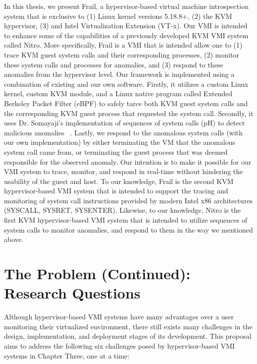 \documentclass{report}
\begin{document}
\begin{spacing}{1.5}
{\large 
In this thesis, we present Frail, a hypervisor-based virtual machine introspection system that is exclusive to (1) Linux kernel versions 5.18.8+, (2) the KVM hypervisor, (3) and Intel Virtualization Extension (VT-x). Our VMI is intended to enhance some of the capabilities of a previously developed KVM VMI system called Nitro. More specifically, Frail is a VMI that is intended allow one to (1) trace KVM guest system calls and their corresponding processes, (2) monitor these system calls and processes for anomalies, and (3) respond to these anomalies from the hypervisor level. Our framework is implemented using a combination of existing and our own software. Firstly, it utilizes a custom Linux kernel, custom KVM module, and a Linux native program called Extended Berkeley Packet Filter (eBPF) to safely tarce both KVM guest system calls and the corresponding KVM guest process that requested the system call. Secondly, it uses Dr. Somayaji's implementation of sequences of system calls (pH) to detect malicious anomalies ~\cite{somayaji2002operating}. Lastly, we respond to the anomalous system calls (with our own implementation) by either terminating the VM that the anomalous system call came from, or terminating the guest process that was deemed responsible for the observed anomaly. Our intention is to make it possible for our VMI system to trace, monitor, and respond in real-time without hindering the usability of the guest and host. To our knowledge, Frail is the second KVM hypervisor-based VMI system that is intended to support the tracing and monitoring of system call instructions provided by modern Intel x86 architectures (SYSCALL, SYSRET, SYSENTER). Likewise, to our knowledge, Nitro is the first KVM hypervisor-based VMI system that is intended to utilize sequences of system calls to monitor anomalies, and respond to them in the way we mentioned above.
\newline
}




\section{The Problem (Continued): Research Questions}

{\large
Although hypervisor-based VMI systems have many advantages over a user monitoring their virtualized environment, there still exists many challenges in the design, implementation, and deployment stages of its development. This proposal aims to address the following six challenges posed by hypervisor-based VMI systems in Chapter Three, one at a time:
\newline
}


\end{spacing}
\end{document}

